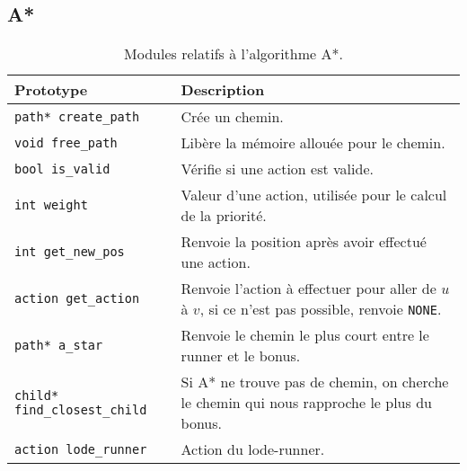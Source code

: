 \newpage

\subsection{A*}

\begin{table}[!htpb]
    \label{tab:modules-a_star}
    \begin{tabularx}{\textwidth}{lX}
        \toprule
        \textbf{Prototype} & \textbf{Description} \\
        \midrule
        \texttt{path* create\_path} & Crée un chemin. \\
        \texttt{void free\_path} & Libère la mémoire allouée pour le chemin. \\
        \texttt{bool is\_valid} & Vérifie si une action est valide. \\
        \texttt{int weight} & Valeur d'une action, utilisée pour le calcul de la priorité. \\
        \texttt{int get\_new\_pos} & Renvoie la position après avoir effectué une action. \\
        \texttt{action get\_action} & Renvoie l'action à effectuer pour aller de $u$ à $v$, si ce n'est pas possible, renvoie \texttt{NONE}. \\
        \texttt{path* a\_star} & Renvoie le chemin le plus court entre le runner et le bonus. \\
        \texttt{child* find\_closest\_child} & Si A* ne trouve pas de chemin, on cherche le chemin qui nous rapproche le plus du bonus. \\
        \texttt{action lode\_runner} & Action du lode-runner. \\
        \bottomrule
    \end{tabularx}
    \caption{Modules relatifs à l'algorithme A*.}
\end{table}


